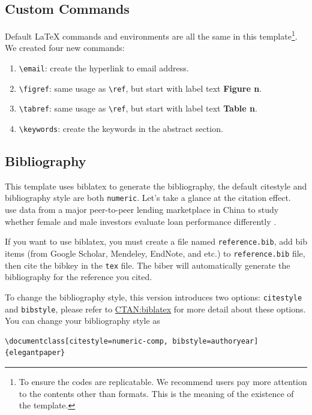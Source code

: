 \documentclass[11pt,en]{elegantpaper}
\begin{document}
\subsection{Custom Commands}
Default \LaTeX{} commands and environments are all the same in this template\footnote{To ensure the codes are replicatable. We recommend users pay more attention to the contents other than formats. This is the meaning of the existence of the template.}. We created four new commands:
\begin{enumerate}
  \item \lstinline{\email}: create the hyperlink to email address.
  \item \lstinline{\figref}: same usage as \lstinline{\ref}, but start with label text \textbf{Figure n}.
  \item \lstinline{\tabref}: same usage as \lstinline{\ref}, but start with label text \textbf{Table n}.
  \item \lstinline{\keywords}: create the keywords in the abstract section.
\end{enumerate}


\subsection{Bibliography}

This template uses biblatex to generate the bibliography, the default citestyle and bibliography style are both \lstinline{numeric}. Let's take a glance at the citation effect. ~\cite{} use data from a major peer-to-peer lending \cite{} marketplace in China to study whether female and male investors evaluate loan performance differently \parencite{}. 

If you want to use biblatex, you must create a file named \lstinline{reference.bib}, add bib items (from Google Scholar, Mendeley, EndNote, and etc.) to \lstinline{reference.bib} file, then cite the bibkey in the \lstinline{tex} file. The biber will automatically generate the bibliography for the reference you cited.


To change the bibliography style, this version introduces two options: \lstinline{citestyle} and \lstinline{bibstyle}, please refer to \href{https://ctan.org/pkg/biblatex}{CTAN:biblatex} for more detail about these options. You can change your bibliography style as

\begin{lstlisting}
\documentclass[citestyle=numeric-comp, bibstyle=authoryear]{elegantpaper} 
\end{lstlisting}
\end{document}
